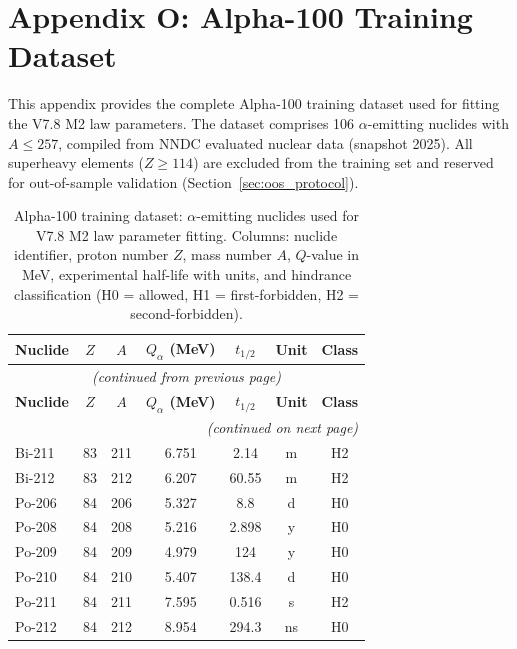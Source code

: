 \documentclass[11pt,a4paper]{article}
\begin{document}
\section{Appendix O: Alpha-100 Training Dataset}
\label{app:alpha100}

This appendix provides the complete Alpha-100 training dataset used for fitting the V7.8 M2 law parameters. The dataset comprises 106 $\alpha$-emitting nuclides with $A \leq 257$, compiled from NNDC evaluated nuclear data (snapshot 2025). All superheavy elements ($Z \geq 114$) are excluded from the training set and reserved for out-of-sample validation (Section~\ref{sec:oos_protocol}).

\begin{small}
\begin{longtable}{lcccccc}
\caption{Alpha-100 training dataset: $\alpha$-emitting nuclides used for V7.8 M2 law parameter fitting. Columns: nuclide identifier, proton number $Z$, mass number $A$, $Q$-value in MeV, experimental half-life with units, and hindrance classification (H0 = allowed, H1 = first-forbidden, H2 = second-forbidden).}
\label{tab:alpha100_dataset}\\
\toprule
\textbf{Nuclide} & \textbf{$Z$} & \textbf{$A$} & \textbf{$Q_\alpha$ (MeV)} & \textbf{$t_{1/2}$} & \textbf{Unit} & \textbf{Class} \\
\midrule
\endfirsthead
\multicolumn{7}{c}{\small\textit{(continued from previous page)}}\\
\toprule
\textbf{Nuclide} & \textbf{$Z$} & \textbf{$A$} & \textbf{$Q_\alpha$ (MeV)} & \textbf{$t_{1/2}$} & \textbf{Unit} & \textbf{Class} \\
\midrule
\endhead
\midrule
\multicolumn{7}{r}{\small\textit{(continued on next page)}}\\
\endfoot
\bottomrule
\endlastfoot
Bi-211 & 83 & 211 & 6.751 & 2.14 & m & H2 \\
Bi-212 & 83 & 212 & 6.207 & 60.55 & m & H2 \\
Po-206 & 84 & 206 & 5.327 & 8.8 & d & H0 \\
Po-208 & 84 & 208 & 5.216 & 2.898 & y & H0 \\
Po-209 & 84 & 209 & 4.979 & 124 & y & H0 \\
Po-210 & 84 & 210 & 5.407 & 138.4 & d & H0 \\
Po-211 & 84 & 211 & 7.595 & 0.516 & s & H2 \\
Po-212 & 84 & 212 & 8.954 & 294.3 & ns & H0 \\

\end{longtable}
\end{small}
\end{document}
